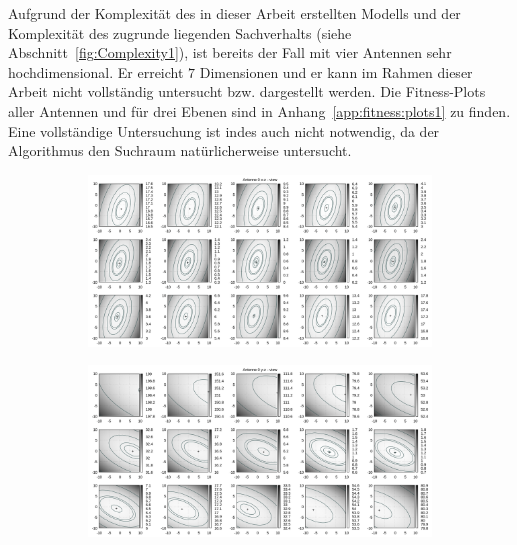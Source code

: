 Aufgrund der Komplexität des in dieser Arbeit erstellten Modells und der Komplexität des zugrunde liegenden Sachverhalts (siehe Abschnitt~\ref{fig:Complexity1}), ist bereits der Fall mit vier Antennen sehr hochdimensional. Er erreicht $7$ Dimensionen und er kann im Rahmen dieser Arbeit nicht vollständig untersucht bzw. dargestellt werden. Die Fitness-Plots aller Antennen und für drei Ebenen sind in Anhang~\ref{app:fitness:plots1} zu finden. Eine vollständige Untersuchung ist indes auch nicht notwendig, da der Algorithmus den Suchraum natürlicherweise untersucht. 
%
\begin{figure}[!h]
	 \caption[Übrige Ebenen für Antenne 1]{Auf diesen Abbildungen zeigen sich die Fitness-Ebenen für die übrigen Ansichten der Antenne 1, x-z und y-z. In der oberen Reihe sind Ebenen über den gesamten Bereich. Die Unteren zeigen eine vergrößerte Darstellung um das Minimum. Zu erkennen ist ein zum Verlauf der x-y-Ebene sehr ähnliches Bild. Ein flaches, längliches Tal mit Minimum. Die Dimension der x- und y-Achse ist [m].} 
	 \label{fig:fitnessplanesA1}
     \centering
     \begin{subfigure}[t]{0.45\textwidth}
             \centering
             \includegraphics[width=\textwidth]{img/fitness/xz_a0.png}
     \end{subfigure}
     \qquad
     \begin{subfigure}[t]{0.45\textwidth}
			\centering
			\includegraphics[width=\textwidth]{img/fitness/yz_a0.png}

\end{subfigure}
\end{figure}
